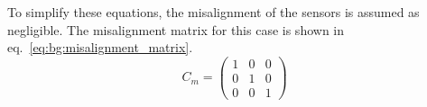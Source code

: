 To simplify these equations, the misalignment of the sensors is assumed as negligible. The misalignment matrix for this case is shown in eq.~\eqref{eq:bg:misalignment_matrix}.
\begin{equation}
    C_m= \begin{pmatrix} 1 & 0 & 0 \\
                         0 & 1 & 0 \\
                         0 & 0 & 1 \end{pmatrix}
                         \label{eq:bg:misalignment_matrix}
\end{equation}